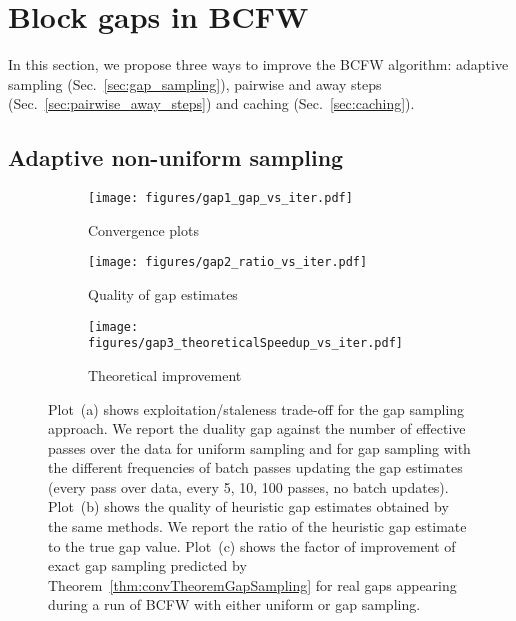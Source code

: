 \documentclass{article}
\newlength{\Stextfloatsep}
\begin{document}
\section{Block gaps in BCFW \label{sec:contributions}}
%
%
%
In this section, we propose three ways to improve the BCFW algorithm: adaptive sampling (Sec.~\ref{sec:gap_sampling}), pairwise and away steps (Sec.~\ref{sec:pairwise_away_steps}) and caching (Sec.~\ref{sec:caching}).

%
%
\subsection{Adaptive non-uniform sampling \label{sec:gap_sampling}}

\setlength{\textfloatsep}{\Stextfloatsep} %
\begin{figure*}
\centering
\begin{subfigure}[b]{0.28\textwidth}
\texttt{[image: figures/gap1\_gap\_vs\_iter.pdf]}
\caption{Convergence plots\label{fig:gapSampling_a}\vspace{-3.5mm}}
\end{subfigure}
\qquad 
\begin{subfigure}[b]{0.28\textwidth}
\texttt{[image: figures/gap2\_ratio\_vs\_iter.pdf]}
\caption{Quality of gap estimates\label{fig:gapSampling_b}\vspace{-3.5mm}}
\end{subfigure}
\qquad 
\begin{subfigure}[b]{0.28\textwidth}
\texttt{[image: figures/gap3\_theoreticalSpeedup\_vs\_iter.pdf]}
\caption{Theoretical improvement\label{fig:gapSampling_c}\vspace{-3.5mm}}
\end{subfigure}
\caption{Plot~(a) shows exploitation/staleness trade-off for the gap sampling approach. We report the duality gap against the number of effective passes over the data for uniform sampling and for gap sampling with the different frequencies of batch passes updating the gap estimates (every pass over data, every 5, 10, 100 passes, no batch updates). Plot~(b) shows the quality of heuristic gap estimates obtained by the same methods. We report the ratio of the heuristic gap estimate to the true gap value. Plot~(c) shows the factor of improvement of exact gap sampling predicted by Theorem~\ref{thm:convTheoremGapSampling} for real gaps appearing during a run of BCFW with either uniform or gap sampling.\vspace{-3.5mm}
    \label{fig:gapSampling}}
\end{figure*}
\end{document}
